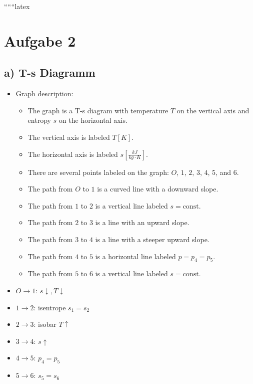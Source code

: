 
``````latex


\section*{Aufgabe 2}
\subsection*{a) T-s Diagramm}

\begin{itemize}
    \item Graph description:
    \begin{itemize}
        \item The graph is a T-s diagram with temperature \( T \) on the vertical axis and entropy \( s \) on the horizontal axis.
        \item The vertical axis is labeled \( T[K] \).
        \item The horizontal axis is labeled \( s \left[ \frac{kJ}{kg \cdot K} \right] \).
        \item There are several points labeled on the graph: \( O \), \( 1 \), \( 2 \), \( 3 \), \( 4 \), \( 5 \), and \( 6 \).
        \item The path from \( O \) to \( 1 \) is a curved line with a downward slope.
        \item The path from \( 1 \) to \( 2 \) is a vertical line labeled \( s = \text{const} \).
        \item The path from \( 2 \) to \( 3 \) is a line with an upward slope.
        \item The path from \( 3 \) to \( 4 \) is a line with a steeper upward slope.
        \item The path from \( 4 \) to \( 5 \) is a horizontal line labeled \( p = p_4 = p_5 \).
        \item The path from \( 5 \) to \( 6 \) is a vertical line labeled \( s = \text{const} \).
    \end{itemize}
\end{itemize}

\begin{itemize}
    \item \( O \rightarrow 1 \): \( s \downarrow, T \downarrow \)
    \item \( 1 \rightarrow 2 \): isentrope \( s_1 = s_2 \)
    \item \( 2 \rightarrow 3 \): isobar \( T \uparrow \)
    \item \( 3 \rightarrow 4 \): \( s \uparrow \)
    \item \( 4 \rightarrow 5 \): \( p_4 = p_5 \)
    \item \( 5 \rightarrow 6 \): \( s_5 = s_6 \)
\end{itemize}

